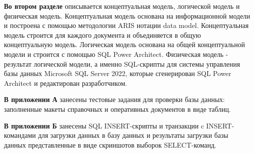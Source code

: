 
\textbf{Во втором разделе} описывается концептуальная модель, логической модель и физическая модель.
Концептуальная модель основана на информационной модели и построена с помощью методологии ARIS нотации data model.
Концептуальная модель строится для каждого документа и объединяется в общую концептуальную модель.
Логическая модель основана на общей концептуальной модели и строится с помощью SQL Power Architect.
Физическая модель - результат логической модели, а именно SQL-скрипты для системы управления базы данных Microsoft SQL Server 2022,
которые сгенерирован SQL Power Architect и редактирован разработчиком.


\textbf{В приложении А} занесены тестовые задания для проверки базы данных: заполненные макеты справочных и оперативных документов в виде таблиц.


\textbf{В приложении Б} занесены SQL INSERT-скрипты и транзакции c INSERT-командами для загрузки данных в базу данных
и результаты загрузки базы данных представленные в виде скриншотов выборок SELECT-команд.

 
\newpage



